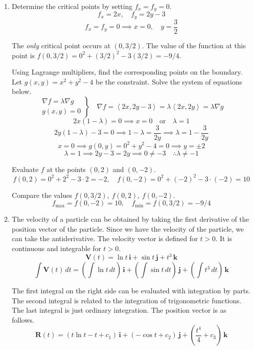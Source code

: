 \documentclass[a4paper, 12pt]{article}
\renewcommand{\headrulewidth}{0pt}
\begin{document}
\newpage
\pagestyle{fancy}
\renewcommand{\headrulewidth}{1pt}


\begin{enumerate}[leftmargin=*,label=\textbf{\arabic*.}]

\item Determine the critical points by setting $f_x=f_y=0$.
\[f_x=2x,\quad f_y=2y-3\]
\[f_x=f_y=0\implies x=0,\quad y=\frac32\]

The \textit{only} critical point occurs at $(0,3/2)$. The value of the function at this point is $f(0, 3/2) = 0^2 + (3/2)^2 -3(3/2)=-9/4$.

Using Lagrange multipliers, find the corresponding points on the boundary. Let $g(x,y)=x^2+y^2-4$ be the constraint. Solve the system of equations below.
\[
\left.
\begin{array}{ll}
\displaystyle\nabla f =\lambda \nabla g\\
\displaystyle g(x,y) = 0
\end{array}
\right\}\quad
\nabla f = \left\langle2x,2y-3\right\rangle=\lambda\left\langle2x,2y\right\rangle= \lambda\nabla g
\]
\[2x(1-\lambda)=0\implies x=0\quad\text{or}\quad\lambda=1\]
\[2y(1-\lambda)-3=0\implies1-\lambda=\frac3{2y}\implies\lambda=1-\frac3{2y}\]
\[x=0\implies g(0,y)=0^2+y^2-4=0\implies y=\pm2\]
\[\lambda=1\implies 2y-3=2y\implies 0\neq-3\quad\therefore\lambda\neq-1\]

Evaluate $f$ at the points $(0,2)$ and $(0,-2)$.
\[f(0,2)=0^2+2^2-3\cdot2=-2,\quad f(0,-2)=0^2+(-2)^2-3\cdot(-2)=10\]

Compare the values $f(0,3/2),\:f(0,2),\:f(0,-2)$.
\[\boxed{f_{\text{max}}=f(0,-2)=10,\quad f_{\text{min}}=f(0,3/2)=-9/4}\]

\item The velocity of a particle can be obtained by taking the first derivative of the position vector of the particle. Since we have the velocity of the particle, we can take the antiderivative. The velocity vector is defined for $t>0$. It is continuous and integrable for $t>0$.
\[\mathbf{V}(t)=\ln t\,\mathbf{i}+\sin t\,\mathbf{j}+t^3\,\mathbf{k}\]
\[\int\mathbf{V}(t)\,dt=\left(\int\ln t\,dt\right)\,\mathbf{i}+\left(\int\sin t\,dt\right)\,\mathbf{j}+\left(\int t^3\,dt\right)\,\mathbf{k}\]

The first integral on the right side can be evaluated with integration by parts. The second integral is related to the integration of trigonometric functions. The last integral is just ordinary integration. The position vector is as follows.
\[\mathbf{R}(t)=(t\ln t- t+c_1)\,\mathbf{i}+(-\cos t+c_2)\,\mathbf{j}+\left(\frac{t^4}4+c_3\right)\,\mathbf{k}\]


\end{enumerate}
\end{document}

